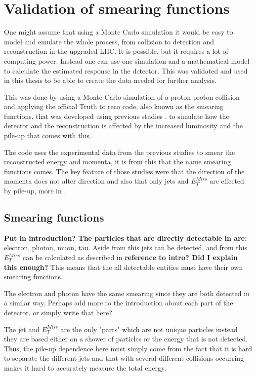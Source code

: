 \chapter{Validation of smearing functions}\label{cha:vali}
One might assume that using a Monte Carlo simulation it would be easy to model and emulate the whole process, from collision to detection and reconstruction in the upgraded LHC. It is possible, but it requires a lot of computing power. Instead one can use one simulation and a mathematical model to calculate the estimated response in the detector. This was validated and used in this thesis to be able to create the data needed for further analysis. 

This was done by using a Monte Carlo simulation of a proton-proton collision and applying the official Truth to reco code, also known as the smearing functions, that was developed using previous studies \citep{ATLAS:LOI2, ATL-PHYS-PUB-2013-004}. to simulate how the detector and the reconstruction is affected by the increased luminosity and the pile-up that comes with this.

The code uses the experimental data from the previous studies to smear the reconstructed energy and momenta, it is from this that the name smearing functions comes.
The key feature of those studies were that the direction of the momenta does not alter direction and also that only jets and $E^{Miss}_T$ are effected by pile-up, more in .

\newpage
\section{Smearing functions}\label{sec:smear}
\textbf{Put in introduction? The particles that are directly detectable in \abbrATLAS are:} electron, photon, muon, tau. Aside from this jets can be detected, and from this $E_T^{Miss}$ can be calculated as described in \textbf{reference to intro? Did I explain this enough?} This means that the all detectable entities must have their own smearing functions. 

The electron and photon have the same smearing since they are both detected in a similar way.  Perhaps add more to the introduction about each part of the detector. or simply write that here?

The jet and $E^{Miss}_T$ are the only "parts" which are not unique particles instead they are based either on a shower of particles or the energy that is not detected. Thus, the pile-up dependence here must simply come from the fact that it is hard to separate the different jets and that with several different collisions occurring makes it hard to accurately measure the total energy.

